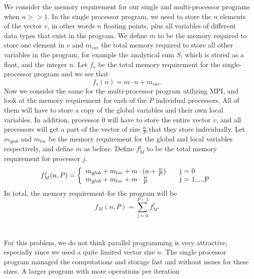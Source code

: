 \documentclass{article}
\begin{document}
We consider the memory requirement for our single and multi-processor programs when $n >> 1$. In the single processor program, we need to store the $n$ elements of the vector $v$, in other words $n$ floating points, plus all variables of different data types that exist in the program. We define $m$ to be the memory required to store one element in $v$ and $m_{var}$ the total memory required to store all other variables in the program, for example the analytical sum $S$, which is stored as a float, and the integer $n$. Let $f_s$ be the total memory requirement for the single-processor program and we see that
\begin{equation}
f_{s}(n) = m \cdot n + m_{var}.
\end{equation}
Now we consider the same for the multi-processor program utilizing MPI, and look at the memory requirement for each of the $P$ individual processors. All of them will have to store a copy of the global variables and their own local variables. In addition, processor $0$ will have to store the entire vector $v$, and all processors will get a part of the vector of size $\frac{n}{P}$ that they store individually. Let $m_{glob}$ and $m_{loc}$ be the memory requirement for the global and local variables respectively, and define $m$ as before. Define $f_M^j$ to be the total memory requirement for processor $j$.
\begin{equation}
f_M^j(n,P) = \left\{
  				\begin{array}{l l}
  				m_{glob} + m_{loc} + m\cdot (n + \frac{n}{P}) & \quad \text{j = 0}\\
  				m_{glob} + m_{loc} + m\cdot \frac{n}{P} & \quad \text{j = 1,...,P} 
  				\end{array} \right.
\end{equation}
In total, the memory requirement for the program will be
\begin{equation}
f_M(n,P) = \sum_{j=0}^{P-1} f_M^j.  
\end{equation}
\\
\\
For this problem, we do not think parallel programming is very attractive, especially since we used a quite limited  vector size $n$. The single processor program managed the computations and storage fast and without issues for these sizes. A larger program with more operations per iteration
\end{document}
